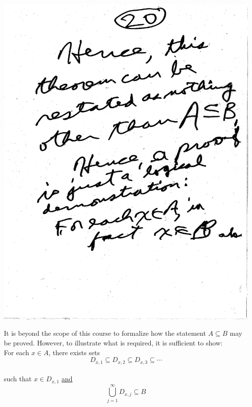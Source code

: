 \documentclass[10pt,a4paper]{article}
\begin{document}
{{\includegraphics[scale=.5]{Pages/ST_20}

\newpage

\noindent It is beyond the scope of this course to formalize how the statement $A \subseteq B$ may be proved. However, to illustrate what is required, it is sufficient to show:
\vspace{2mm}
\\ For each $x \in A$, there exists sets 
$$ D_{x, 1} \subseteq D_{x, 2} \subseteq D_{x, 3} \subseteq \cdots $$
\\ such that $x \in D_{x, 1}$ \underline{and}
$$ \bigcup_{j=1}^{\infty} D_{x, j} \subseteq B$$

}}
\end{document}
